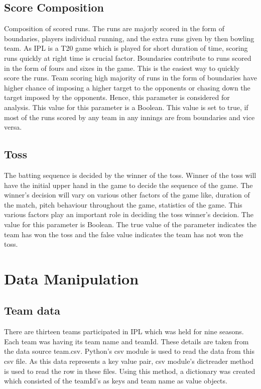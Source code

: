 \documentclass[sigconf]{acmart}
\begin{document}
\subsection{Score Composition}
Composition of scored runs. The runs are majorly scored in the form of boundaries, players individual running,  and the extra runs given by then bowling team. As IPL is a T20 game which is played for short duration of time, scoring runs quickly at right time is crucial factor. Boundaries contribute to runs scored in the form of fours and sixes in the game. This is the easiest way to quickly score the runs. Team scoring high majority of runs in the form of boundaries have higher chance of imposing a higher target to the opponents or chasing down the target imposed by the opponents. Hence, this parameter is considered for analysis. This value for this parameter is a Boolean. This value is set to true, if most of the runs scored by any team in any innings are from boundaries and vice versa.

\subsection{Toss}
The batting sequence is decided by the winner of the toss. Winner of the toss will have the initial upper hand in the game to decide the sequence of the game. The winner’s decision will vary on various other factors of the game like, duration of the match, pitch behaviour throughout the game, statistics of the game. This various factors play an important role in deciding the toss winner’s decision. The value for this parameter is Boolean. The true value of the parameter indicates the team has won the toss and the false value indicates the team has not won the toss.

\section{Data Manipulation}

\subsection{Team data}
There are thirteen teams participated in IPL which was held for nine seasons. Each team was having its team name and teamId. These details are taken from the data source team.csv. Python’s csv module is used to read the data from this csv file. As this data represents a key value pair, csv module’s dictreader method is used to read the row in these files. Using this method, a dictionary was created which consisted of the teamId’s as keys and team name as value objects. 
\end{document}
